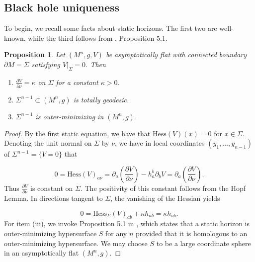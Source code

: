 \documentclass[12pt,twoside]{article}
\theoremstyle{plain}
\newtheorem{prop}[theorem]{Proposition}
\theoremstyle{definition}
\theoremstyle{remark}
\numberwithin{equation}{section}
\begin{document}
\subsection{Black hole uniqueness}
To begin, we recall some facts about static horizons. The first two are well-known, while the third follows from \cite{BM23}, Proposition 5.1.

\begin{prop} \label{horizon_boundary}
Let $(M^{n},g,V)$ be asymptotically flat with connected boundary $\partial M= \Sigma$ satisfying $V|_{\Sigma} = 0$. Then

\begin{enumerate} [label=\roman*.]
     \item $\frac{\partial V}{\partial \nu} = \kappa$ on $\Sigma$ for a constant $\kappa > 0$.
    \item $\Sigma^{n-1} \subset (M^{n},g)$ is totally geodesic.
    \item $\Sigma^{n-1}$ is outer-minimizing in $(M^{n},g)$.
\end{enumerate}
\end{prop}
\begin{proof}
By the first static equation, we have that $\text{Hess} \left(V \right) (x) = 0$ for $x \in \Sigma$. Denoting the unit normal on $\Sigma$ by $\nu$, we have in local coordinates $(y_{1},\dots,y_{n-1})$ of $\Sigma^{n-1}= \{ V =  0 \}$ that

\begin{equation*}
    0 = \text{Hess} \left( V \right)_{a\nu} = \partial_{a} \left( \frac{\partial V}{\partial \nu} \right) - h_{a}^{b} \partial_{b} V = \partial_{a} \left( \frac{\partial V}{\partial \nu} \right).
\end{equation*}
Thus $\frac{\partial V}{\partial \nu}$ is constant on $\Sigma$. The positivity of this constant follows from the Hopf Lemma. In directions tangent to $\Sigma$, the vanishing of the Hessian yields

\begin{equation*}
    0= \text{Hess}_{\Sigma}\left(V \right)_{ab} + \kappa h_{ab} = \kappa h_{ab}.
\end{equation*}
For item (iii), we invoke Proposition 5.1 in \cite{BM23}, which states that a static horizon is outer-minimizing hypersurface $S$ for any $n$ provided that it is homologous to an outer-minimizing hypersurface. We may choose $S$ to be a large coordinate sphere in an asymptotically flat $(M^{n},g)$. 
\end{proof}
\end{document}
